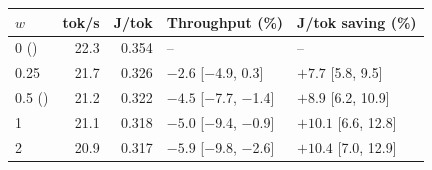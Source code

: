 \begin{tabular}{@{}lrrll@{}}
\toprule
$w$ & tok/s & J/tok & Throughput (\%) & J/tok saving (\%)\\
\midrule
0 (\capes{}) & 22.3 & 0.354 & -- & --\\
0.25 & 21.7 & 0.326 & $-2.6$ [$-$4.9, 0.3] & $+7.7$ [5.8, 9.5]\\
0.5 (\capee{}) & 21.2 & 0.322 & $-4.5$ [$-$7.7, $-$1.4] & $+8.9$ [6.2, 10.9]\\
1 & 21.1 & 0.318 & $-5.0$ [$-$9.4, $-$0.9] & $+10.1$ [6.6, 12.8]\\
2 & 20.9 & 0.317 & $-5.9$ [$-$9.8, $-$2.6] & $+10.4$ [7.0, 12.9]\\
\bottomrule
\end{tabular}
